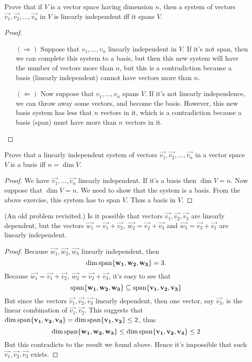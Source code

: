 \begin{exercise}
  Prove that if $V$ is a vector space having dimension $n$, then
  a system of vectors $\vec{v_1},\vec{v_2},\dots,\vec{v_n}$ in $V$
  is linearly independent iff it spans $V$.
\end{exercise}
\begin{proof}
  \text{}
  \begin{itemize}
    \item[$(\Longrightarrow)$] Suppose that $v_1,\dots,v_n$ linearly
      independent in $V$. If it's not span, then we can complete
      this system to a basis, but then this new system will have 
      the number of vectors more than $n$, but this is a contradiction
      because a basis (linearly independent) cannot have vectors more 
      than $n$.
    \item[$(\Longleftarrow)$] Now suppose that $v_1,\dots,v_n$ spans
      $V$. If it's not linearly independence, we can throw away some
      vectors, and become the basis. However, this new basis system
      has less that $n$ vectors in it, which is a contradiction because
      a basis (span) must have more than $n$ vectors in it.
  \end{itemize}
\end{proof}
\begin{exercise}
  Prove that a linearly independent system of vectors
  $\vec{v_1},\vec{v_2},\dots,\vec{v_n}$ in a vector
  space $V$ is a basis iff $n=\dim V$.
\end{exercise}
\begin{proof}
  We have $\vec{v_1},\dots,\vec{v_n}$ linearly independent.
  If it's a basis then $\dim V=n$. Now suppose that $\dim V=n$.
  We need to show that the system is a basis. From the above
  exercise, this system has to span $V$. Thus a basis in $V$.
\end{proof}
\begin{exercise}
  (An old problem revisited.) Is it possible that 
  vectors $\vec{v_1}, \vec{v_2}, \vec{v_3}$ are linearly
  dependent, but the vectors 
  $\vec{w_1}=\vec{v_1}+\vec{v_2},~\vec{w_2}=\vec{v_2}+\vec{v_3}$
  and $\vec{w_3}=\vec{v_3}+\vec{v_1}$ are linearly independent.
\end{exercise}
\begin{proof}
  Because $\vec{w_1},\vec{w_2},\vec{w_3}$ linearly independent, then
  \[\dim\operatorname{span}\{\mathbf{w_1},\mathbf{w_2},\mathbf{w_3}\}=3.\]
  Because $\vec{w_1}=\vec{v_1}+\vec{v_2},~\vec{w_2}=\vec{v_2}+\vec{v_3}$,
  it's easy to see that
  \[
    \operatorname{span}\{\mathbf{w_1},\mathbf{w_2},\mathbf{w_3}\}\subseteq
    \operatorname{span}\{\mathbf{v_1},\mathbf{v_2},\mathbf{v_3}\}
  \]
  But since the vectors $\vec{v_1},\vec{v_2},\vec{v_3}$ linearly dependent, 
  then one vector, say $\vec{v_3}$, is the linear combination of 
  $\vec{v_1},\vec{v_2}$. This suggests that 
  $\dim\operatorname{span}\{\mathbf{v_1},\mathbf{v_2},\mathbf{v_3}\}=
  \dim\operatorname{span}\{\mathbf{v_1},\mathbf{v_2}\}\leq 2$, 
  thus
  \[
    \dim\operatorname{span}\{\mathbf{w_1},\mathbf{w_2},\mathbf{w_3}\}\leq
    \dim\operatorname{span}\{\mathbf{v_1},\mathbf{v_2},\mathbf{v_3}\}
    \leq 2
  \]
  But this contradicts to the result we found above. Hence it's 
  impossible that such $\vec{v_1},\vec{v_2},\vec{v_3}$ exists.
\end{proof}
